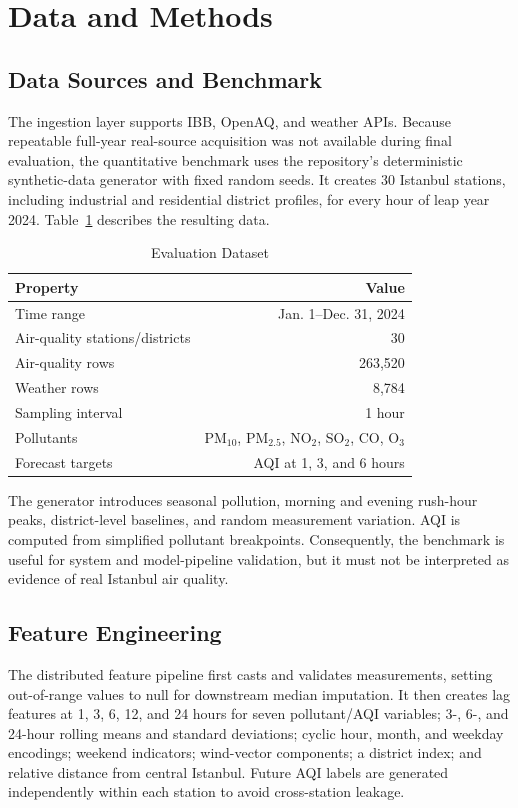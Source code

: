 \documentclass[conference]{IEEEtran}
\begin{document}
\section{Data and Methods}
\subsection{Data Sources and Benchmark}
The ingestion layer supports IBB, OpenAQ, and weather APIs. Because repeatable
full-year real-source acquisition was not available during final evaluation,
the quantitative benchmark uses the repository's deterministic synthetic-data
generator with fixed random seeds. It creates 30 Istanbul stations, including
industrial and residential district profiles, for every hour of leap year
2024. Table~\ref{tab:data} describes the resulting data.

\begin{table}[t]
\caption{Evaluation Dataset}
\label{tab:data}
\centering
\begin{tabular}{lr}
\toprule
\textbf{Property} & \textbf{Value}\\
\midrule
Time range & Jan. 1--Dec. 31, 2024\\
Air-quality stations/districts & 30\\
Air-quality rows & 263,520\\
Weather rows & 8,784\\
Sampling interval & 1 hour\\
Pollutants & PM$_{10}$, PM$_{2.5}$, NO$_2$, SO$_2$, CO, O$_3$\\
Forecast targets & AQI at 1, 3, and 6 hours\\
\bottomrule
\end{tabular}
\end{table}

The generator introduces seasonal pollution, morning and evening rush-hour
peaks, district-level baselines, and random measurement variation. AQI is
computed from simplified pollutant breakpoints. Consequently, the benchmark
is useful for system and model-pipeline validation, but it must not be
interpreted as evidence of real Istanbul air quality.

\subsection{Feature Engineering}
The distributed feature pipeline first casts and validates measurements,
setting out-of-range values to null for downstream median imputation. It then
creates lag features at 1, 3, 6, 12, and 24 hours for seven pollutant/AQI
variables; 3-, 6-, and 24-hour rolling means and standard deviations; cyclic
hour, month, and weekday encodings; weekend indicators; wind-vector
components; a district index; and relative distance from central Istanbul.
Future AQI labels are generated independently within each station to avoid
cross-station leakage.
\end{document}
